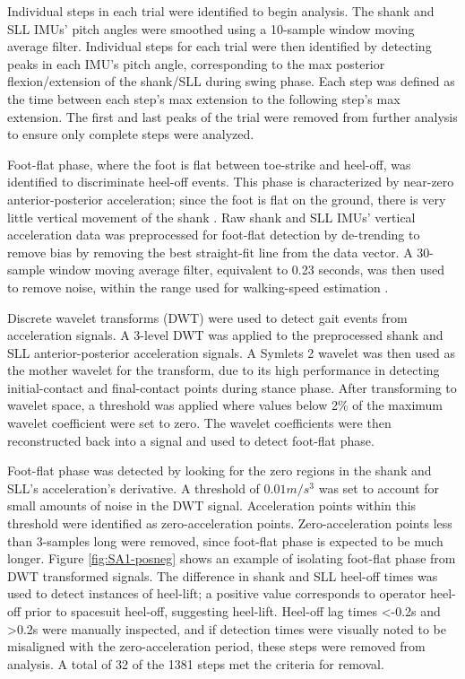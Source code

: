 \documentclass[defaultstyle,11pt]{thesis}
\begin{document}
Individual steps in each trial were identified to begin analysis.
The shank and SLL IMUs' pitch angles were smoothed using a 10-sample window moving average filter.
Individual steps for each trial were then identified by detecting peaks in each IMU's pitch angle, corresponding to the max posterior flexion/extension of the shank/SLL during swing phase.
Each step was defined as the time between each step's max extension to the following step's max extension.
The first and last peaks of the trial were removed from further analysis to ensure only complete steps were analyzed.

Foot-flat phase, where the foot is flat between toe-strike and heel-off, was identified to discriminate heel-off events.
This phase is characterized by near-zero anterior-posterior acceleration; since the foot is flat on the ground, there is very little vertical movement of the shank \citep{Rebula2013}.
Raw shank and SLL IMUs' vertical acceleration data was preprocessed for foot-flat detection by de-trending to remove bias by removing the best straight-fit line from the data vector.
A 30-sample window moving average filter, equivalent to 0.23 seconds, was then used to remove noise, within the range used for walking-speed estimation \citep{Byun2019}.

Discrete wavelet transforms (DWT) were used to detect gait events from acceleration signals\citep{Ji2019}.
A 3-level DWT was applied to the preprocessed shank and SLL anterior-posterior acceleration signals.
A Symlets 2 wavelet was then used as the mother wavelet for the transform, due to its high performance in detecting initial-contact and final-contact points during stance phase\citep{Ji2019}.
After transforming to wavelet space, a threshold was applied where values below 2\% of the maximum wavelet coefficient were set to zero.
The wavelet coefficients were then reconstructed back into a signal and used to detect foot-flat phase.

Foot-flat phase was detected by looking for the zero regions in the shank and SLL's acceleration's derivative.
A threshold of \(0.01 m/s^3\) was set to account for small amounts of noise in the DWT signal.
Acceleration points within this threshold were identified as zero-acceleration points.
Zero-acceleration points less than 3-samples long were removed, since foot-flat phase is expected to be much longer.
Figure \ref{fig:SA1-posneg} shows an example of isolating foot-flat phase from DWT transformed signals.
The difference in shank and SLL heel-off times was used to detect instances of heel-lift; a positive value corresponds to operator heel-off prior to spacesuit heel-off, suggesting heel-lift.
Heel-off lag times \textless-0.2s and \textgreater0.2s were manually inspected, and if detection times were visually noted to be misaligned with the zero-acceleration period, these steps were removed from analysis.
A total of 32 of the 1381 steps met the criteria for removal.
\end{document}
